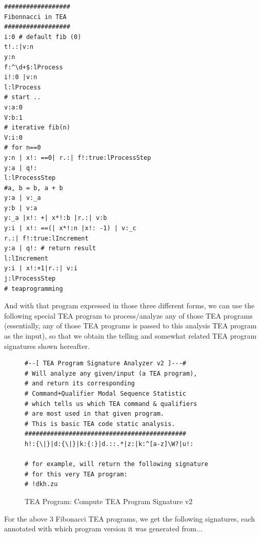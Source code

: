 \documentclass[a4paper, 18pt]{book} %
\begin{document}
\vspace{2em}
  \begin{tcolorbox}[teaterminalstyle, title=TEA Program: Compute Fib(n) - Mixed Form TEA code]
  \begin{lstlisting}[language=TEA]
##################
Fibonnacci in TEA
##################
i:0 # default fib (0)
t!.:|v:n
y:n
f:^\d+$:lProcess
i!:0 |v:n
l:lProcess
# start ..
v:a:0
V:b:1
# iterative fib(n)
V:i:0
# for n==0
y:n | x!: ==0| r.:| f!:true:lProcessStep
y:a | q!:
l:lProcessStep
#a, b = b, a + b
y:a | v:_a
y:b | v:a
y:_a |x!: +| x*!:b |r.:| v:b
y:i | x!: ==(| x*!:n |x!: -1) | v:_c
r.:| f!:true:lIncrement
y:a | q!: # return result
l:lIncrement
y:i | x!:+1|r.:| v:i
j:lProcessStep
# teaprogramming
   \end{lstlisting}
  \end{tcolorbox}
\vspace{2em}


And with that program expressed in those three different forms, we can use the following special TEA program to process/analyze any of those TEA programs (essentially, any of those TEA programs is passed to this analysis TEA program as the input), so that we obtain the telling and somewhat related TEA program signatures shown hereafter.


\vspace{2em}
\begin{figure}[H]
 \Large
  \centering
 \begin{tcolorbox}[teaterminalstyle, title=TEA Program: Compute TEA Program Signature]
  \begin{lstlisting}[language=TEA]
#--[ TEA Program Signature Analyzer v2 ]---#
# Will analyze any given/input (a TEA program),
# and return its corresponding
# Command+Qualifier Modal Sequence Statistic
# which tells us which TEA command & qualifiers
# are most used in that given program.
# This is basic TEA code static analysis.
############################################
h!:{\|}|d:{\|}|k:{:}|d.::.*|z:|k:^[a-z]\W?|u!:

# for example, will return the following signature
# for this very TEA program:
# !dkh.zu
   \end{lstlisting}
  \end{tcolorbox}
  \caption{TEA Program: Compute TEA Program Signature v2}
\end{figure}
\vspace{2em}


For the above 3 Fibonacci TEA programs, we get the following signatures, each annotated with which program version it was generated from...
\end{document}
